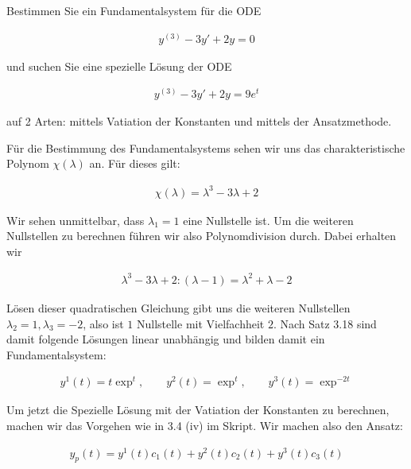 \begin{exercise}
  Bestimmen Sie ein Fundamentalsystem für die ODE

  \begin{align*}
    y^{(3)} - 3y' + 2y = 0
  \end{align*}

  und suchen Sie eine spezielle Lösung der ODE

  \begin{align*}
    y^{(3)} - 3y' + 2y = 9 e^t
  \end{align*}

  auf 2 Arten:  mittels Vatiation der Konstanten und mittels der Ansatzmethode.
\end{exercise}

\begin{solution}
Für die Bestimmung des Fundamentalsystems sehen wir uns das charakteristische Polynom
$\chi(\lambda)$ an. Für dieses gilt:

\begin{align*}
  \chi(\lambda) = \lambda^3 - 3\lambda + 2
\end{align*}

Wir sehen unmittelbar, dass $\lambda_1 = 1$ eine Nullstelle ist. Um die weiteren
Nullstellen zu berechnen führen wir also Polynomdivision durch. Dabei erhalten wir

\begin{align*}
  \lambda^3 - 3\lambda + 2 : (\lambda - 1) = \lambda^2 + \lambda - 2
\end{align*}

Lösen dieser quadratischen Gleichung gibt uns die weiteren Nullstellen
$\lambda_2 = 1, \lambda_3 = -2$, also ist $1$ Nullstelle mit Vielfachheit $2$.
Nach Satz 3.18 sind damit folgende Lösungen linear unabhängig und bilden damit ein
Fundamentalsystem:

\begin{align*}
y^1(t) = t\exp^t, \qquad y^2(t) = \exp^t,\qquad y^3(t) =  \exp^{-2t}
\end{align*}

Um jetzt die Spezielle Lösung mit der Vatiation der Konstanten zu berechnen, machen
wir das Vorgehen wie in 3.4 (iv) im Skript. Wir machen also den Ansatz:

\begin{align*}
  y_p (t)= y^1 (t) c_1 (t) + y^2 (t) c_2 (t) + y^3 (t) c_3 (t)
\end{align*}


\end{solution}
